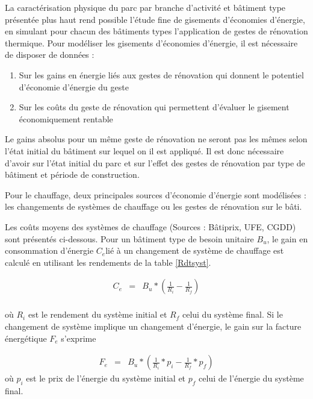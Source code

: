 \documentclass[10.5pt,a4paper]{article}
\begin{document}
{La caractérisation physique du parc par branche d’activité et bâtiment type présentée plus haut rend possible l’étude fine de gisements d’économies d’énergie, en simulant pour chacun des bâtiments types l’application de gestes de rénovation thermique. Pour modéliser les gisements d'économies d'énergie, il est nécessaire de disposer de données : 

\begin{enumerate}
	\item Sur les gains en énergie liés aux gestes de rénovation qui donnent le potentiel d'économie d'énergie du geste 
	\item Sur les coûts du geste de rénovation qui permettent d'évaluer le gisement économiquement rentable
\end{enumerate}

Le gains absolus pour un même geste de rénovation ne seront pas les mêmes selon l'état initial du bâtiment sur lequel on il est appliqué. Il est donc nécessaire d'avoir sur l'état initial du parc et sur l'effet des gestes de rénovation par type de bâtiment et période de construction.   

Pour le chauffage, deux principales sources d'économie d'énergie sont modélisées : les changements de systèmes de chauffage ou les gestes de rénovation sur le bâti. 

Les coûts moyens des systèmes de chauffage (Sources : Bâtiprix, UFE, CGDD) sont présentés ci-dessous. Pour un bâtiment type de besoin unitaire $B_u$, le gain en consommation d'énergie  $C_e$lié à un changement de système de chauffage est calculé en utilisant les rendements de la table \ref{Rdtsyst}. 

\begin{eqnarray}
 C_e &= &B_u * ( \frac{1}{R_i} -  \frac{1}{R_f}) \\
\end{eqnarray}

où $R_i$ est le rendement du système initial et $R_f$ celui du système final. Si le changement de système implique un changement d'énergie, le gain sur la facture énergétique  $F_e$ s'exprime

\begin{eqnarray}
 F_e &= & B_u * ( \frac{1}{R_i} * p_i -  \frac{1}{R_f}* p_f)  
\end{eqnarray}
où $p_i$ est le prix de l'énergie du système initial et $p_f$ celui de l'énergie du système final.  


}
\end{document}
